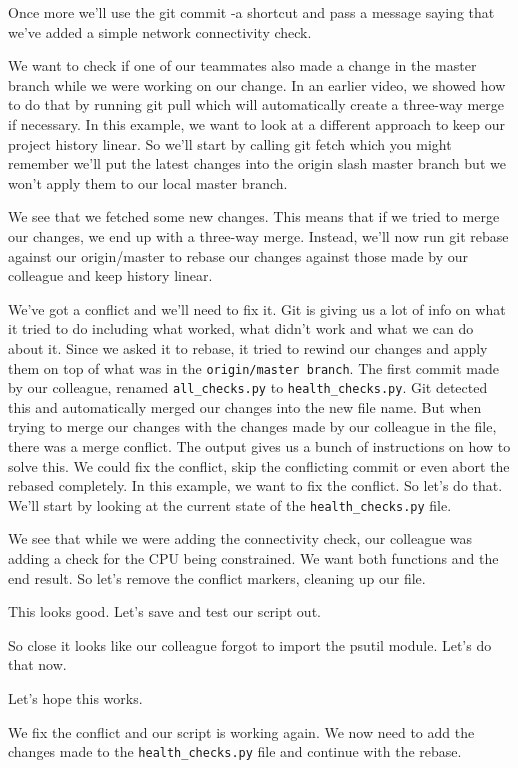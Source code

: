 	Once more we'll use the git commit -a shortcut and pass a message saying that we've added a simple network connectivity check.
	
	We want to check if one of our teammates also made a change in the master branch while we were working on our change. In an earlier video, we showed how to do that by running git pull which will automatically create a three-way merge if necessary. In this example, we want to look at a different approach to keep our project history linear. So we'll start by calling git fetch which you might remember we'll put the latest changes into the origin slash master branch but we won't apply them to our local master branch.
	
	We see that we fetched some new changes. This means that if we tried to merge our changes, we end up with a three-way merge. Instead, we'll now run git rebase against our origin/master to rebase our changes against those made by our colleague and keep history linear.
	
	We've got a conflict and we'll need to fix it. Git is giving us a lot of info on what it tried to do including what worked, what didn't work and what we can do about it. Since we asked it to rebase, it tried to rewind our changes and apply them on top of what was in the \verb|origin/master branch|. The first commit made by our colleague, renamed \verb|all_checks.py| to \verb|health_checks.py|. Git detected this and automatically merged our changes into the new file name. But when trying to merge our changes with the changes made by our colleague in the file, there was a merge conflict. The output gives us a bunch of instructions on how to solve this. We could fix the conflict, skip the conflicting commit or even abort the rebased completely. In this example, we want to fix the conflict. So let's do that. We'll start by looking at the current state of the \verb|health_checks.py| file.
	
	We see that while we were adding the connectivity check, our colleague was adding a check for the CPU being constrained. We want both functions and the end result. So let's remove the conflict markers, cleaning up our file.
	
	This looks good. Let's save and test our script out.
	
	So close it looks like our colleague forgot to import the psutil module. Let's do that now.
	
	Let's hope this works.
	
	We fix the conflict and our script is working again. We now need to add the changes made to the \verb|health_checks.py| file and continue with the rebase.
	
